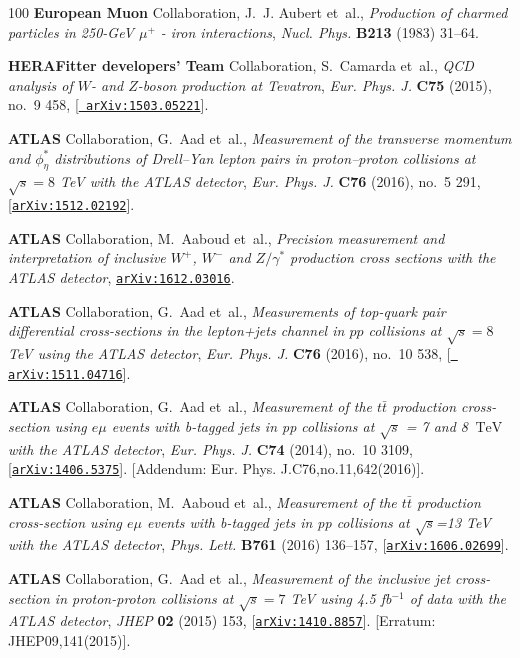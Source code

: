 \begin{thebibliography}{100}
{\bf European Muon} Collaboration, J.~J. Aubert et~al., {\it {Production of
  charmed particles in 250-GeV $\mu^+$ - iron interactions}},  {\em Nucl.
  Phys.} {\bf B213} (1983) 31--64.

{\bf HERAFitter developers' Team} Collaboration, S.~Camarda et~al., {\it {QCD
  analysis of $W$- and $Z$-boson production at Tevatron}},  {\em Eur. Phys. J.}
  {\bf C75} (2015), no.~9 458, [\href{http://arxiv.org/abs/1503.05221}{{\tt
  arXiv:1503.05221}}].

{\bf ATLAS} Collaboration, G.~Aad et~al., {\it {Measurement of the transverse
  momentum and $\phi ^*_{\eta }$ distributions of Drell–Yan lepton pairs in
  proton–proton collisions at $\sqrt{s}=8$ TeV with the ATLAS detector}},
  {\em Eur. Phys. J.} {\bf C76} (2016), no.~5 291,
  [\href{http://arxiv.org/abs/1512.02192}{{\tt arXiv:1512.02192}}].

{\bf ATLAS} Collaboration, M.~Aaboud et~al., {\it {Precision measurement and
  interpretation of inclusive $W^+$, $W^-$ and $Z/\gamma^*$ production cross
  sections with the ATLAS detector}},
  \href{http://arxiv.org/abs/1612.03016}{{\tt arXiv:1612.03016}}.

{\bf ATLAS} Collaboration, G.~Aad et~al., {\it {Measurements of top-quark pair
  differential cross-sections in the lepton+jets channel in $pp$ collisions at
  $\sqrt{s}=8$ TeV using the ATLAS detector}},  {\em Eur. Phys. J.} {\bf C76}
  (2016), no.~10 538, [\href{http://arxiv.org/abs/1511.04716}{{\tt
  arXiv:1511.04716}}].

{\bf ATLAS} Collaboration, G.~Aad et~al., {\it {Measurement of the $t\bar{t}$
  production cross-section using $e\mu $ events with b-tagged jets in pp
  collisions at $\sqrt{s}$ = 7 and 8 $\,\mathrm{TeV}$ with the ATLAS
  detector}},  {\em Eur. Phys. J.} {\bf C74} (2014), no.~10 3109,
  [\href{http://arxiv.org/abs/1406.5375}{{\tt arXiv:1406.5375}}]. [Addendum:
  Eur. Phys. J.C76,no.11,642(2016)].

{\bf ATLAS} Collaboration, M.~Aaboud et~al., {\it {Measurement of the
  $t\bar{t}$ production cross-section using $e\mu$ events with b-tagged jets in
  pp collisions at $\sqrt{s}$=13 TeV with the ATLAS detector}},  {\em Phys.
  Lett.} {\bf B761} (2016) 136--157,
  [\href{http://arxiv.org/abs/1606.02699}{{\tt arXiv:1606.02699}}].

{\bf ATLAS} Collaboration, G.~Aad et~al., {\it {Measurement of the inclusive
  jet cross-section in proton-proton collisions at $ \sqrt{s}=7 $ TeV using 4.5
  fb$^{−1}$ of data with the ATLAS detector}},  {\em JHEP} {\bf 02} (2015)
  153, [\href{http://arxiv.org/abs/1410.8857}{{\tt arXiv:1410.8857}}].
  [Erratum: JHEP09,141(2015)].


\end{thebibliography}
